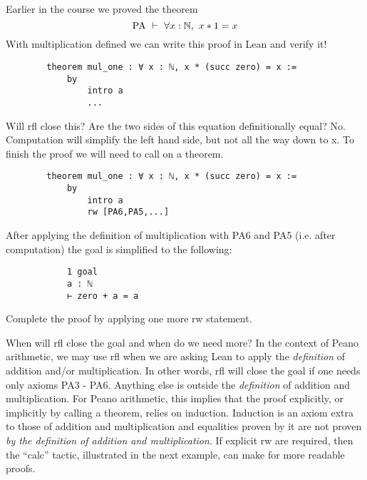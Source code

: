 \documentclass{book}
\begin{document}
\begin{eg}
    Earlier in the course we proved the theorem $$\text{PA} \ \vdash \ \forall x : \mathbb{N}, \ x * 1 = x$$ With multiplication defined we can write this proof in Lean and verify it! 
    \begin{center}
        \begin{lstlisting}
        theorem mul_one : ∀ x : ℕ, x * (succ zero) = x :=
            by
                intro a
                ...
        \end{lstlisting}
    \end{center}
    Will rfl close this? Are the two sides of this equation definitionally equal? No. Computation will simplify the left hand side, but not all the way down to x. To finish the proof we will need to call on a theorem. 
    \begin{center}
        \begin{lstlisting}
        theorem mul_one : ∀ x : ℕ, x * (succ zero) = x :=
            by
                intro a
                rw [PA6,PA5,...]
        \end{lstlisting}
    \end{center}
    After applying the definition of multiplication with PA6 and PA5 (i.e. after computation) the goal is simplified to the following:
        \begin{lstlisting}
            1 goal
            a : ℕ
            ⊢ zero + a = a
        \end{lstlisting}    
    Complete the proof by applying one more rw statement. 
\end{eg}

When will rfl close the goal and when do we need more? In the context of Peano arithmetic, we may use rfl when we are asking Lean to apply the \emph{definition} of addition and/or multiplication. In other words, rfl will close the goal if one needs only axioms PA3 - PA6. Anything else is outside the \emph{definition} of addition and multiplication. For Peano arithmetic, this implies that the proof explicitly, or implicitly by calling a theorem, relies on induction. Induction is an axiom extra to those of addition and multiplication and equalities proven by it are not proven \emph{by the definition of addition and multiplication}. If explicit rw are required, then the ``calc'' tactic, illustrated in the next example, can make for more readable proofs. 
\end{document}

